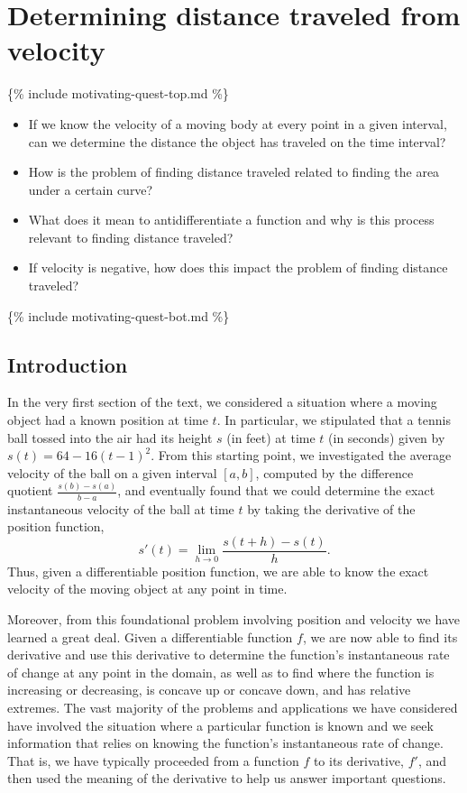 \section{Determining distance traveled from velocity} \label{S:4.1.VelocityDistance}

\vspace*{-14 pt}
\{\% include motivating-quest-top.md \%\}
\begin{itemize}
\item If we know the velocity of a moving body at every point in a given interval, can we determine the distance the object has traveled on the time interval?
\item How is the problem of finding distance traveled related to finding the area under a certain curve?
\item What does it mean to antidifferentiate a function and why is this process relevant to finding distance traveled?
\item If velocity is negative, how does this impact the problem of finding distance traveled?
\end{itemize}
\{\% include motivating-quest-bot.md \%\}

\subsection*{Introduction}

In the very first section of the text, we considered a situation where a moving object had a known position at time $t$.  In particular, we stipulated that a tennis ball tossed into the air had its height $s$ (in feet) at time $t$ (in seconds) given by $s(t) = 64 - 16(t-1)^2$.  From this starting point, we investigated the average velocity of the ball on a given interval $[a,b]$, computed by the difference quotient $\frac{s(b)-s(a)}{b-a}$, and eventually found that we could determine the exact instantaneous velocity of the ball at time $t$ by taking the derivative of the position function,
$$s'(t) = \lim_{h \to 0} \frac{s(t+h)-s(t)}{h}.$$
Thus, given a differentiable position function, we are able to know the exact velocity of the moving object at any point in time.

Moreover, from this foundational problem involving position and velocity we have learned a great deal.  Given a differentiable function $f$, we are now able to find its derivative and use this derivative to determine the function's instantaneous rate of change at any point in the domain, as well as to find where the function is increasing or decreasing, is concave up or concave down, and has relative extremes.  The vast majority of the problems and applications we have considered have involved the situation where a particular function is known and we seek information that relies on knowing the function's instantaneous rate of change.  That is, we have typically proceeded from a function $f$ to its derivative, $f'$, and then used the meaning of the derivative to help us answer important questions.  

